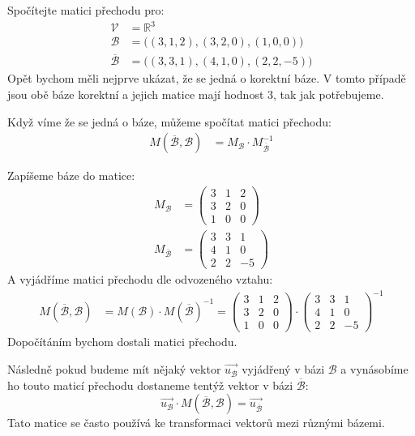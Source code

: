 \begin{example}
    Spočítejte matici přechodu pro:
    \begin{align*}
        \mathcal{V} &= \mathbb{R}^3\\
        \mathcal{B} &= \big ( (3, 1, 2), (3, 2, 0), (1, 0, 0) \big)\\
         \overline{\mathcal{B}} &= \big ( (3, 3, 1), (4, 1, 0), (2, 2, -5) \big)
    \end{align*}
    Opět bychom měli nejprve ukázat, že se jedná o korektní báze. V tomto případě jsou obě
    báze korektní a jejich matice mají hodnost 3, tak jak potřebujeme.

    Když víme že se jedná o báze, můžeme spočítat matici přechodu:
    \begin{align*}
        M(\overline{\mathcal{B}}, \mathcal{B}) &=  M_{\mathcal{B}} \cdot M_{\overline{\mathcal{B}}}^{-1}
    \end{align*}

    Zapíšeme báze do matice:
    \begin{align*}
        M_{\mathcal{B}} & =
        \begin{pmatrix}
            3 & 1 & 2\\
            3 & 2 & 0\\
            1 & 0 & 0
        \end{pmatrix}\\
        M_{\overline{\mathcal{B}}} &=
        \begin{pmatrix}
            3 & 3 & 1\\
            4 & 1 & 0\\
            2 & 2 & -5
        \end{pmatrix}
    \end{align*}
    A vyjádříme matici přechodu dle odvozeného vztahu:
    \begin{align*}
        M(\overline{\mathcal{B}}, \mathcal{B}) &= M(\mathcal{B}) \cdot M(\overline{\mathcal{B}})^{-1} =
        \begin{pmatrix}
            3 & 1 & 2\\
            3 & 2 & 0\\
            1 & 0 & 0
        \end{pmatrix} \cdot
        \begin{pmatrix}
            3 & 3 & 1\\
            4 & 1 & 0\\
            2 & 2 & -5
        \end{pmatrix} ^ {-1}
    \end{align*}
    Dopočítáním bychom dostali matici přechodu.

    Následně pokud budeme mít nějaký vektor $\vec{u_{\mathcal{B}}}$ vyjádřený v bázi $\mathcal{B}$ a
    vynásobíme ho touto maticí přechodu dostaneme tentýž vektor v bázi $\overline{\mathcal{B}}$:
    $$\vec{u_{\mathcal{B}}} \cdot M(\overline{\mathcal{B}}, \mathcal{B}) = \vec{u_{\overline{\mathcal{B}}}}$$
    Tato matice se často používá ke transformaci vektorů mezi různými bázemi.
\end{example}


